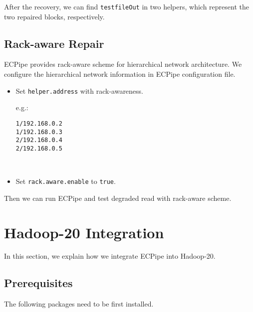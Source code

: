 \documentclass[letterpaper,12pt]{article}
\newcommand{\sysname}{{\sf\small ECPipe}\xspace}
\begin{document}
\begin{center}
\noindent{}
\end{center}

After the recovery, we can find {\tt testfileOut} in two helpers, which
represent the two repaired blocks, respectively.


\subsection{Rack-aware Repair}

\sysname provides rack-aware scheme for hierarchical network architecture. We
configure the hierarchical network information in \sysname configuration file.

\begin{itemize}
  \item Set {\tt helper.address} with rack-awareness.

  e.g.:
  \parbox[t]{3in}{\tt 1/192.168.0.2\\
  1/192.168.0.3\\
  2/192.168.0.4\\
  2/192.168.0.5}
  \smallskip\\

  \item Set {\tt rack.aware.enable} to {\tt true}.

\end{itemize}

Then we can run \sysname and test degraded read with rack-aware scheme.

\section{Hadoop-20 Integration}

In this section, we explain how we integrate \sysname into Hadoop-20.

\subsection{Prerequisites}

The following packages need to be first installed.
\end{document}
